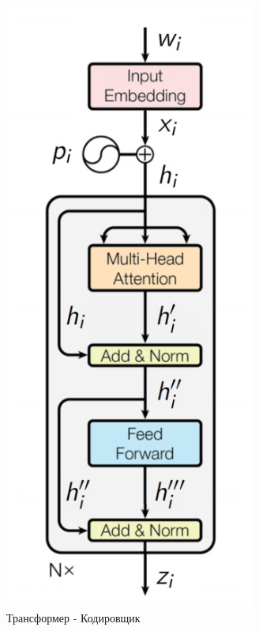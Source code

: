 \begin{figure}[H]
\begin{minipage}{0.3\textwidth}
        \includegraphics[width=\textwidth]{results/transformer_encoder.png}
        \caption{Трансформер - Кодировщик}
    \end{minipage}
\end{figure}

